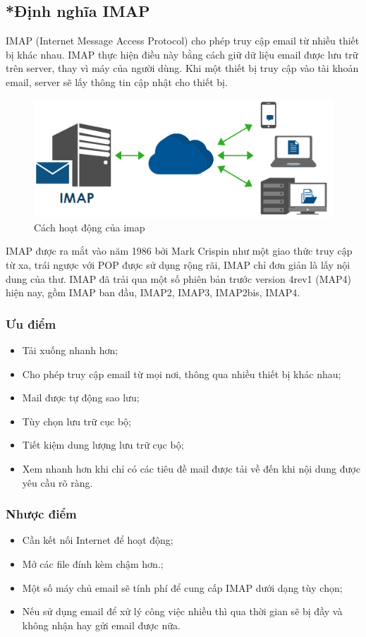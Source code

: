 \documentclass[APA,STIX1COL]{WileyNJD-v2}
\begin{document}
\subsection*{*Định nghĩa IMAP}
IMAP (Internet Message Access Protocol) cho phép truy cập email từ nhiều thiết bị khác nhau. IMAP thực hiện điều này bằng cách giữ dữ liệu email được lưu trữ trên server, thay vì máy của người dùng. Khi một thiết bị truy cập vào tài khoản email, server sẽ lấy thông tin cập nhật cho thiết bị.
\begin{figure}[h]
  \centering
  \includegraphics[scale=0.5]{imap}
  \caption{Cách hoạt động của imap}
  \label{fig:imap}
\end{figure}

IMAP được ra mắt vào năm 1986 bởi Mark Crispin như một giao thức truy cập từ xa, trái ngược với POP được sử dụng rộng rãi, IMAP chỉ đơn giản là lấy nội dung của thư. IMAP đã trải qua một số phiên bản trước version 4rev1 (MAP4) hiện nay, gồm IMAP ban đầu, IMAP2, IMAP3, IMAP2bis, IMAP4.

\subsubsection*{Ưu điểm}
\begin{itemize}
  \item Tải xuống nhanh hơn;
  \item Cho phép truy cập email từ mọi nơi, thông qua nhiều thiết bị khác nhau;
  \item Mail được tự động sao lưu;
  \item Tùy chọn lưu trữ cục bộ;
  \item Tiết kiệm dung lượng lưu trữ cục bộ;
  \item Xem nhanh hơn khi chỉ có các tiêu đề mail được tải về đến khi nội dung được yêu cầu rõ ràng.
\end{itemize}

\subsubsection*{Nhược điểm}
\begin{itemize}
  \item Cần kết nối Internet để hoạt động;
  \item Mở các file đính kèm chậm hơn.;
  \item Một số máy chủ email sẽ tính phí để cung cấp IMAP dưới dạng tùy chọn;
  \item Nếu sử dụng email để xử lý công việc nhiều thì qua thời gian sẽ bị đầy và không nhận hay gửi email được nữa.
\end{itemize}
\end{document}
